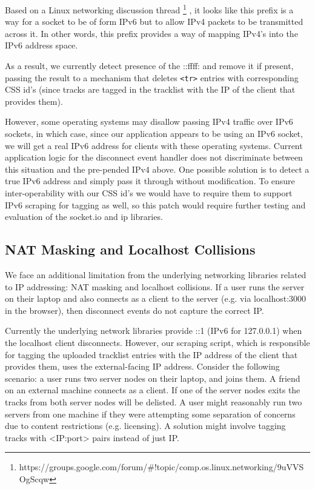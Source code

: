 \documentclass[12pt]{article}
\begin{document}
Based on a Linux networking discussion thread \footnote{https://groups.google.com/forum/\#!topic/comp.os.linux.networking/9uVVSOgScqw} , it looks like this prefix is a way for a socket to be of form IPv6 but to allow IPv4 packets to be transmitted across it. In other words, this prefix provides a way of mapping IPv4's into the IPv6 address space.

As a result, we currently detect presence of the ::ffff: and remove it if present, passing the result to a mechanism that deletes {\tt <tr>} entries with corresponding CSS id's (since tracks are tagged in the tracklist with the IP of the client that provides them).

However, some operating systems may disallow passing IPv4 traffic over IPv6 sockets, in which case, since our application appears to be using an IPv6 socket, we will get a real IPv6 address for clients with these operating systems. Current application logic for the disconnect event handler does not discriminate between this situation and the pre-pended IPv4 above. One possible solution is to detect a true IPv6 address and simply pass it through without modification. To ensure inter-operability with our CSS id's we would have to require them to support IPv6 scraping for tagging as well, so this patch would require further testing and evaluation of the socket.io and ip libraries.

\subsection{NAT Masking and Localhost Collisions}
We face an additional limitation from the underlying networking libraries related to IP addressing: NAT masking and localhost collisions. If a user runs the server on their laptop and also connects as a client to the server (e.g. via localhost:3000 in the browser), then disconnect events do not capture the correct IP.

Currently the underlying network libraries provide ::1 (IPv6 for 127.0.0.1) when the localhost client disconnects. However, our scraping script, which is responsible for tagging the uploaded tracklist entries with the IP address of the client that provides them, uses the external-facing IP address. Consider the following scenario: a user runs two server nodes on their laptop, and joins them. A friend on an external machine connects as a client. If one of the server nodes exits the tracks from both server nodes will be delisted. A user might reasonably run two servers from one machine if they were attempting some separation of concerns due to content restrictions (e.g. licensing). A solution might involve tagging tracks with {\textless}IP:port{\textgreater} pairs instead of just IP.
\end{document}
